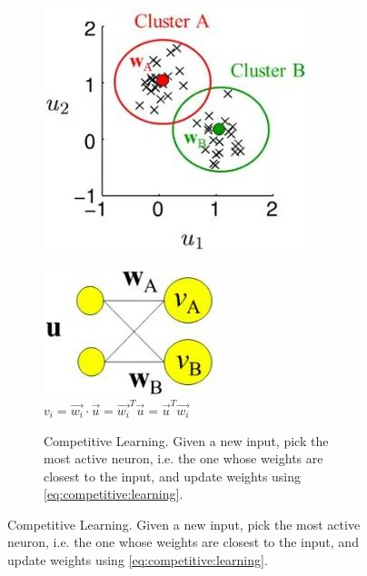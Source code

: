 \documentclass[]{article}
\begin{document}
\begin{figure}[H]
\begin{subfigure}[t]{0.45\textwidth}
		\includegraphics[width=\textwidth]{neurons-clusters1}
	\end{subfigure}
	\begin{subfigure}[t]{0.45\textwidth}
		\caption{$v_i=\vec{w_i}\cdot\vec{u}=\vec{w_i}^T\vec{u}=\vec{u}^T\vec{w_i}$}
		\includegraphics[width=\textwidth]{neurons-clusters2}
	\end{subfigure}
	\begin{subfigure}[t]{0.45\textwidth}
		\caption{Competitive Learning. Given a new input, pick the most active neuron, i.e. the one whose weights are closest to the input, and update weights using \eqref{eq:competitive:learning}.}\label{fig:competitive:learning}

\end{subfigure}
\end{figure}
\end{document}

